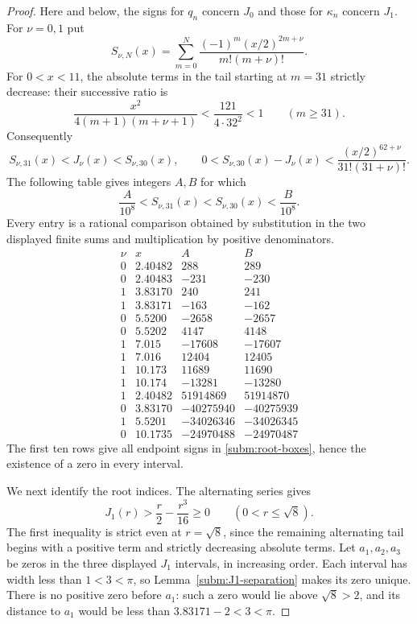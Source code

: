 \documentclass[11pt,letterpaper,reqno]{amsart}
\theoremstyle{definition}
\begin{document}
\begin{proof}
Here and below, the signs for $q_n$ concern $J_0$ and those for
$\kappa_n$ concern $J_1$.  For $\nu=0,1$ put
\[
 S_{\nu,N}(x)=\sum_{m=0}^N
 \frac{(-1)^m(x/2)^{2m+\nu}}{m!(m+\nu)!}.
\]
For $0<x<11$, the absolute terms in the tail starting at $m=31$
strictly decrease: their successive ratio is
\[
 \frac{x^2}{4(m+1)(m+\nu+1)}
 <\frac{121}{4\cdot32^2}<1\qquad(m\ge31).
\]
Consequently
\begin{equation}
 S_{\nu,31}(x)<J_\nu(x)<S_{\nu,30}(x),\qquad
 0<S_{\nu,30}(x)-J_\nu(x)
 <\frac{(x/2)^{62+\nu}}{31!(31+\nu)!}.
\end{equation}
The following table gives integers
$A,B$ for which
\[
 \frac A{10^8}<S_{\nu,31}(x)<S_{\nu,30}(x)<\frac B{10^8}.
\]
Every entry is a rational comparison obtained by substitution in the
two displayed finite sums and multiplication by positive denominators.
\begin{equation}\label{subm:rational-record}
\begin{array}{c|r|r|r}
 \nu&x&A&B\\\hline
 0&2.40482&288&289\\
 0&2.40483&-231&-230\\
 1&3.83170&240&241\\
 1&3.83171&-163&-162\\
 0&5.5200&-2658&-2657\\
 0&5.5202&4147&4148\\
 1&7.015&-17608&-17607\\
 1&7.016&12404&12405\\
 1&10.173&11689&11690\\
 1&10.174&-13281&-13280\\\hline
 1&2.40482&51914869&51914870\\
 0&3.83170&-40275940&-40275939\\
 1&5.5201&-34026346&-34026345\\
 0&10.1735&-24970488&-24970487
\end{array}
\end{equation}
The first ten rows give all endpoint signs in
\eqref{subm:root-boxes}, hence the existence of a zero in every
interval.

We next identify the root indices.  The alternating series gives
\[
 J_1(r)>\frac r2-\frac{r^3}{16}\ge0
 \qquad(0<r\le\sqrt8).
\]
The first inequality is strict even at $r=\sqrt8$, since the
remaining alternating tail begins with a positive term and strictly
decreasing absolute terms.  Let $a_1,a_2,a_3$ be zeros in the three
displayed $J_1$ intervals, in increasing order.  Each interval has
width less than $1<3<\pi$, so Lemma~\ref{subm:J1-separation}
makes its zero unique.  There is no positive zero before $a_1$:
such a zero would lie above $\sqrt8>2$, and its distance to $a_1$
would be less than $3.83171-2<3<\pi$.


\end{proof}
\end{document}

